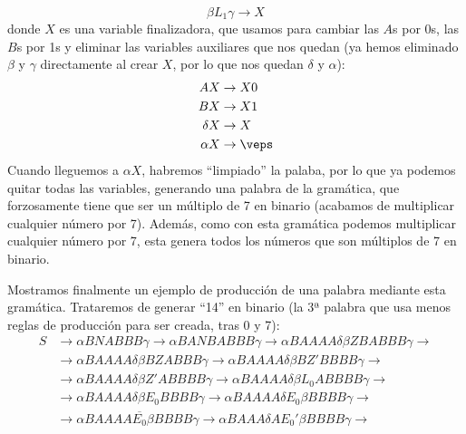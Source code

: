\begin{ejercicio}
\begin{enumerate}
\begin{description}
\begin{itemize}
\begin{equation*}
                                \beta L_1 \gamma \rightarrow X
                            \end{equation*}
                            donde $X$ es una variable finalizadora, que usamos para cambiar las $A$s por 0s, las $B$s por 1s y eliminar las variables auxiliares que nos quedan (ya hemos eliminado $\beta$ y $\gamma$ directamente al crear $X$, por lo que nos quedan $\delta$ y $\alpha$):
                            \begin{align*}
                                AX &\rightarrow X0 \\
                                BX &\rightarrow X1 \\
                                \delta X &\rightarrow X \\
                                \alpha X &\rightarrow \veps
                            \end{align*}
                            Cuando lleguemos a $\alpha X$, habremos ``limpiado'' la palaba, por lo que ya podemos quitar todas las variables, generando una palabra de la gramática, que forzosamente tiene que ser un múltiplo de 7 en binario (acabamos de multiplicar cualquier número por 7). Además, como con esta gramática podemos multiplicar cualquier número por 7, esta genera todos los números que son múltiplos de 7 en binario.
                    \end{itemize}
                Mostramos finalmente un ejemplo de producción de una palabra mediante esta gramática. Trataremos de generar ``14'' en binario (la 3ª palabra que usa menos reglas de producción para ser creada, tras 0 y 7):
                \begin{align*}
                    S &\rightarrow \alpha BNABBB \gamma \rightarrow \alpha BANBABBB\gamma \rightarrow \alpha BAAAA \delta \beta Z BABBB\gamma \rightarrow \\
                      &\rightarrow \alpha BAAAA\delta \beta BZABBB\gamma \rightarrow \alpha BAAAA \delta \beta BZ' BBBB \gamma \rightarrow \\
                      &\rightarrow \alpha BAAAA \delta \beta Z' ABBBB \gamma \rightarrow \alpha BAAAA\delta \beta L_0 ABBBB\gamma \rightarrow \\
                      &\rightarrow \alpha BAAAA\delta \beta E_0 BBBB \gamma \rightarrow \alpha BAAAA\delta E_0 \beta BBBB\gamma \rightarrow \\
                      &\rightarrow \alpha BAAAA \overline{E_0}\beta BBBB\gamma \rightarrow \alpha BAAA \delta A E_0' \beta BBBB \gamma \rightarrow \\

\end{align*}
\end{description}
\end{enumerate}
\end{ejercicio}
